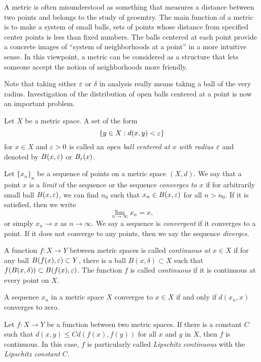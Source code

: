 \documentclass{../note}
\begin{document}
\begin{prb}
A metric is often misunderstood as something that measures a distance between two points and belongs to the study of geoemtry.
The main function of a metric is to make a system of small balls, sets of points whose distance from specified center points is less than fixed numbers.
The balls centered at each point provide a concrete images of ``system of neighborhoods at a point'' in a more intuitive sense.
In this viewpoint, a metric can be considered as a structure that lets someone accept the notion of neighborhoods more friendly.

Note that taking either $\varepsilon$ or $\delta$ in analysis really means taking a ball of the very radius.
Investigation of the distribution of open balls centered at a point is now an important problem.

Let $X$ be a metric space.
A set of the form 
\[\{y\in X:d(x,y)<\varepsilon\}\]
for $x\in X$ and $\varepsilon>0$ is called an \emph{open ball centered at $x$ with radius $\varepsilon$} and denoted by $B(x,\varepsilon)$ or $B_\varepsilon(x)$.
\end{prb}

\begin{prb}
Let $\{x_n\}_n$ be a sequence of points on a metric space $(X,d)$.
We say that a point $x$ is a \emph{limit} of the sequence or the sequence \emph{converges to $x$} if for arbitrarily small ball $B(x,\varepsilon)$, we can find $n_0$ such that $x_n\in B(x,\varepsilon)$ for all $n>n_0$.
If it is satisfied, then we write
\[\lim_{n\to\infty}x_n=x,\]
or simply $x_n\to x$ as $n\to\infty$.
We say a sequence is \emph{convergent} if it converges to a point.
If it does not converge to any points, then we say the sequence \emph{diverges}.

A function $f:X\to Y$ between metric spaces is called \emph{continuous at $x\in X$} if for any ball $B(f(x),\varepsilon)\subset Y$, there is a ball $B(x,\delta)\subset X$ such that $f(B(x,\delta))\subset B(f(x),\varepsilon)$.
The function $f$ is called \emph{continuous} if it is continuous at every point on $X$.
\begin{parts}
\item A sequence $x_n$ in a metric space $X$ converges to $x\in X$ if and only if $d(x_n,x)$ converges to zero.
\item 
Let $f:X\to Y$ be a function between two metric spaces.
If there is a constant $C$ such that $d(x,y)\le Cd(f(x),f(y))$ for all $x$ and $y$ in $X$, then $f$ is continuous.
In this case, $f$ is particularly called \emph{Lipschitz continuous} with the \emph{Lipschitz constant} $C$.
\end{parts}
\end{prb}
\end{document}
